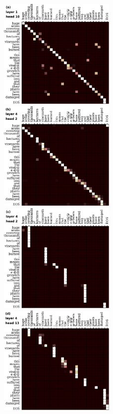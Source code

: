 \documentclass[11pt,a4paper]{article}
\begin{document}
\begin{figure}
\includegraphics[width=0.5\textwidth]{balustrades/hms3-n-k9-l0-e.pdf}\hspace{2mm}
\includegraphics[width=0.5\textwidth]{balustrades/hms3-n-k4-l0-e.pdf}\\
\includegraphics[width=0.5\textwidth]{balustrades/hms3-n-k1-l3-e.pdf}\hspace{2mm}
\includegraphics[width=0.5\textwidth]{balustrades/hms3-n-k12-l3-e.pdf}\\

\end{figure}
\end{document}
